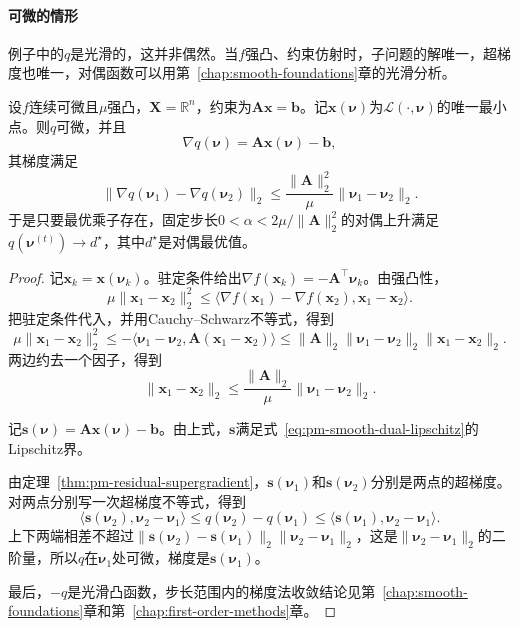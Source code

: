 \paragraph{可微的情形}
例子中的$q$是光滑的，这并非偶然。当$f$强凸、约束仿射时，子问题的解唯一，超梯度也唯一，对偶函数可以用第~\ref{chap:smooth-foundations}章的光滑分析。

\begin{theorem}[强凸目标的光滑对偶]
\label{thm:pm-smooth-dual}
设$f$连续可微且$\mu$强凸，$\bm{X}=\mathbb{R}^n$，约束为$\bm{A}\bm{x}=\bm{b}$。记$\bm{x}(\bm{\nu})$为$\mathcal{L}(\cdot,\bm{\nu})$的唯一最小点。则$q$可微，并且
\begin{equation}
 \nabla q(\bm{\nu})=\bm{A}\bm{x}(\bm{\nu})-\bm{b},
 \label{eq:pm-smooth-dual}
\end{equation}
其梯度满足
\begin{equation}
 \lVert\nabla q(\bm{\nu}_1)-\nabla q(\bm{\nu}_2)\rVert_2\leq\frac{\lVert\bm{A}\rVert_2^2}{\mu}\lVert\bm{\nu}_1-\bm{\nu}_2\rVert_2 .
 \label{eq:pm-smooth-dual-lipschitz}
\end{equation}
于是只要最优乘子存在，固定步长$0<\alpha<2\mu/\lVert\bm{A}\rVert_2^2$的对偶上升满足$q(\bm{\nu}^{(t)})\to d^\star$，其中$d^\star$是对偶最优值。
\end{theorem}

\begin{proof}
记$\bm{x}_k=\bm{x}(\bm{\nu}_k)$。驻定条件给出$\nabla f(\bm{x}_k)=-\bm{A}^\top\bm{\nu}_k$。由强凸性，
\[
 \mu\lVert\bm{x}_1-\bm{x}_2\rVert_2^2\leq\langle\nabla f(\bm{x}_1)-\nabla f(\bm{x}_2),\bm{x}_1-\bm{x}_2\rangle .
\]
把驻定条件代入，并用Cauchy--Schwarz不等式，得到
\[
 \mu\lVert\bm{x}_1-\bm{x}_2\rVert_2^2
 \leq-\langle\bm{\nu}_1-\bm{\nu}_2,\bm{A}(\bm{x}_1-\bm{x}_2)\rangle
 \leq\lVert\bm{A}\rVert_2\lVert\bm{\nu}_1-\bm{\nu}_2\rVert_2\lVert\bm{x}_1-\bm{x}_2\rVert_2 .
\]
两边约去一个因子，得到
\[
 \lVert\bm{x}_1-\bm{x}_2\rVert_2\leq\frac{\lVert\bm{A}\rVert_2}{\mu}\lVert\bm{\nu}_1-\bm{\nu}_2\rVert_2 .
\]

记$\bm{s}(\bm{\nu})=\bm{A}\bm{x}(\bm{\nu})-\bm{b}$。由上式，$\bm{s}$满足式~\eqref{eq:pm-smooth-dual-lipschitz}的Lipschitz界。

由定理~\ref{thm:pm-residual-supergradient}，$\bm{s}(\bm{\nu}_1)$和$\bm{s}(\bm{\nu}_2)$分别是两点的超梯度。对两点分别写一次超梯度不等式，得到
\[
 \langle\bm{s}(\bm{\nu}_2),\bm{\nu}_2-\bm{\nu}_1\rangle\leq q(\bm{\nu}_2)-q(\bm{\nu}_1)\leq\langle\bm{s}(\bm{\nu}_1),\bm{\nu}_2-\bm{\nu}_1\rangle .
\]
上下两端相差不超过$\lVert\bm{s}(\bm{\nu}_2)-\bm{s}(\bm{\nu}_1)\rVert_2\lVert\bm{\nu}_2-\bm{\nu}_1\rVert_2$，这是$\lVert\bm{\nu}_2-\bm{\nu}_1\rVert_2$的二阶量，所以$q$在$\bm{\nu}_1$处可微，梯度是$\bm{s}(\bm{\nu}_1)$。

最后，$-q$是光滑凸函数，步长范围内的梯度法收敛结论见第~\ref{chap:smooth-foundations}章和第~\ref{chap:first-order-methods}章。
\end{proof}

